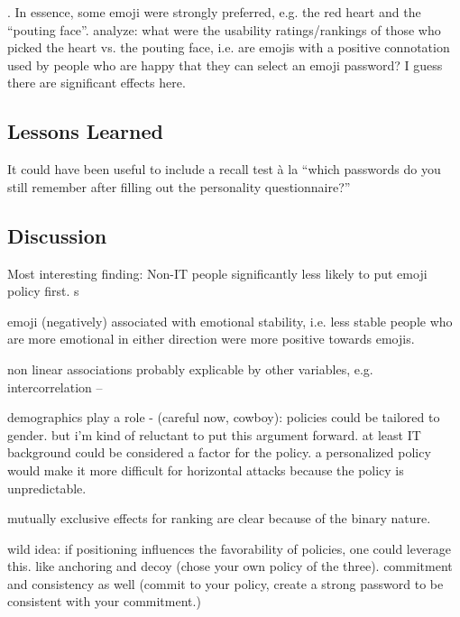 . In essence, some emoji were strongly preferred, e.g. the red heart and the ``pouting face''. analyze: what were the usability ratings/rankings of those who picked the heart vs. the pouting face, i.e. are emojis with a positive connotation used by people who are happy that they can select an emoji password? I guess there are significant effects here. 

\subsection{Lessons Learned}
It could have been useful to include a recall test à la ``which passwords do you still remember after filling out the personality questionnaire?'' 

\subsection{Discussion}
Most interesting finding: Non-IT people significantly less likely to put emoji policy first. s

emoji (negatively) associated with emotional stability, i.e. less stable people who are more emotional in either direction were more positive towards emojis.

non linear associations probably explicable by other variables, e.g. intercorrelation -- 

demographics play a role - (careful now, cowboy): policies could be tailored to gender. but i'm kind of reluctant to put this argument forward. at least IT background could be considered a factor for the policy. a personalized policy would make it more difficult for horizontal attacks because the policy is unpredictable.

mutually exclusive effects for ranking are clear because of the binary nature.

wild idea: if positioning influences the favorability of policies, one could leverage this. like anchoring and decoy (chose your own policy of the three). commitment and consistency as well (commit to your policy, create a strong password to be consistent with your commitment.)